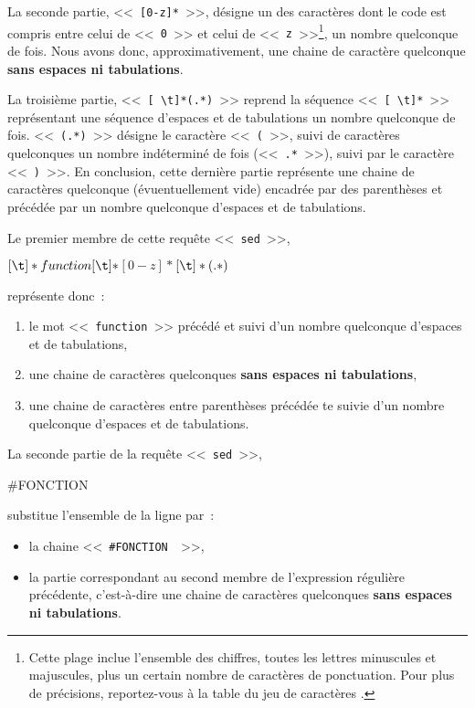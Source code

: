 \begin{example}
La seconde partie, <<~\verb=[0-z]*=~>>, d{\'e}signe un des caract{\`e}res
dont le code {\ASCII} est compris entre celui de <<~{\tt 0}~>> et celui
de <<~{\tt z}~>>\footnote{Cette plage inclue l'ensemble des chiffres,
toutes les lettres minuscules et majuscules, plus un certain nombre de
caract{\`e}res de ponctuation. Pour plus de pr{\'e}cisions, reportez-vous
{\`a} la table du jeu de caract{\`e}res {\ASCII}.}, un nombre quelconque de fois.
Nous avons donc, approximativement, une chaine de caract{\`e}re quelconque
{\bf sans espaces ni tabulations}.

La troisi{\`e}me partie, <<~\verb*=[ \t]*(.*)=~>> reprend la s{\'e}quence
<<~\verb*=[ \t]*=~>> repr{\'e}sentant une s{\'e}quence d'espaces et de tabulations
un nombre quelconque de fois. <<~\verb*=(.*)=~>> d{\'e}signe le caract{\`e}re
<<~{\tt (}~>>, suivi de caract{\`e}res quelconques un nombre ind{\'e}termin{\'e} de fois
(<<~\verb=.*=~>>), suivi par le caract{\`e}re <<~{\tt )}~>>. En conclusion,
cette derni{\`e}re partie repr{\'e}sente une chaine de caract{\`e}res quelconque
({\'e}vuentuellement vide) encadr{\'e}e par des parenth{\`e}ses et pr{\'e}c{\'e}d{\'e}e par un
nombre quelconque d'espaces et de tabulations.

Le premier membre de cette requ{\^e}te <<~{\tt sed}~>>,
\begin{center}
\begin{verbatim*}
\([ \t]*function[ \t]*\)\([0-z]*\)\([ \t]*(.*)\)
\end{verbatim*}
\end{center}
repr{\'e}sente donc~:
\begin{enumerate}
	\item	le mot <<~{\tt function}~>> pr{\'e}c{\'e}d{\'e} et suivi d'un nombre
			quelconque d'espaces et de tabulations,
	\item	une chaine de caract{\`e}res quelconques {\bf sans espaces ni
			tabulations},
	\item	une chaine de caract{\`e}res entre parenth{\`e}ses pr{\'e}c{\'e}d{\'e}e te suivie
			d'un nombre quelconque d'espaces et de tabulations.
\end{enumerate}

La seconde partie de la requ{\^e}te <<~{\tt sed}~>>,
\begin{center}
\begin{verbatim*}
#FONCTION \2
\end{verbatim*}
\end{center}
substitue l'ensemble de la ligne par~:
\begin{itemize}
	\item	la chaine <<~\verb*=#FONCTION =~>>,
	\item	la partie correspondant au second membre de l'expression
			r{\'e}guli{\`e}re pr{\'e}c{\'e}dente, c'est-{\`a}-dire une chaine de caract{\`e}res
			quelconques {\bf sans espaces ni tabulations}.
\end{itemize}
\end{example}

